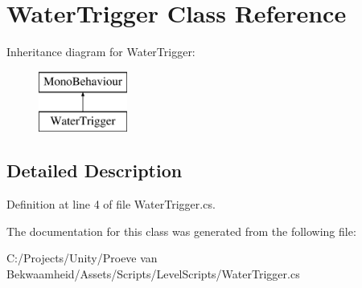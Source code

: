 \hypertarget{class_water_trigger}{\section{Water\+Trigger Class Reference}
\label{class_water_trigger}
}
Inheritance diagram for Water\+Trigger\+:\begin{figure}[H]
\begin{center}
\leavevmode
\includegraphics[height=2.000000cm]{class_water_trigger}
\end{center}
\end{figure}


\subsection{Detailed Description}


Definition at line 4 of file Water\+Trigger.\+cs.



The documentation for this class was generated from the following file\+:\begin{DoxyCompactItemize}
\item 
C\+:/\+Projects/\+Unity/\+Proeve van Bekwaamheid/\+Assets/\+Scripts/\+Level\+Scripts/Water\+Trigger.\+cs\end{DoxyCompactItemize}
